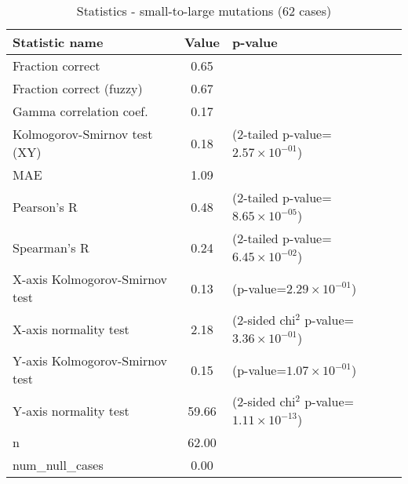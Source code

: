 \documentclass[10pt, letterpaper, oneside, titlepage, landscape]{scrreprt}
\begin{document}
\begin{table}[H]\begin{center}
\begin{tabular}{ l S[table-format=3.2] l}
Statistic name & {Value} & p-value\\
\hline
Fraction correct & 0.65 & \\
Fraction correct (fuzzy) & 0.67 & \\
Gamma correlation coef. & 0.17 & \\
Kolmogorov-Smirnov test (XY) & 0.18 & (2-tailed p-value=$2.57\times10^{-01}$)\\
MAE & 1.09 & \\
Pearson's R & 0.48 & (2-tailed p-value=$8.65\times10^{-05}$)\\
Spearman's R & 0.24 & (2-tailed p-value=$6.45\times10^{-02}$)\\
X-axis Kolmogorov-Smirnov test & 0.13 & (p-value=$2.29\times10^{-01}$)\\
X-axis normality test & 2.18 & (2-sided chi$^{2}$ p-value=$3.36\times10^{-01}$)\\
Y-axis Kolmogorov-Smirnov test & 0.15 & (p-value=$1.07\times10^{-01}$)\\
Y-axis normality test & 59.66 & (2-sided chi$^{2}$ p-value=$1.11\times10^{-13}$)\\
n & 62.00 & \\
num\_null\_cases & 0.00 & \\
\end{tabular}
\caption{Statistics - small-to-large mutations (62 cases)}
\end{center}\end{table}
\end{document}
